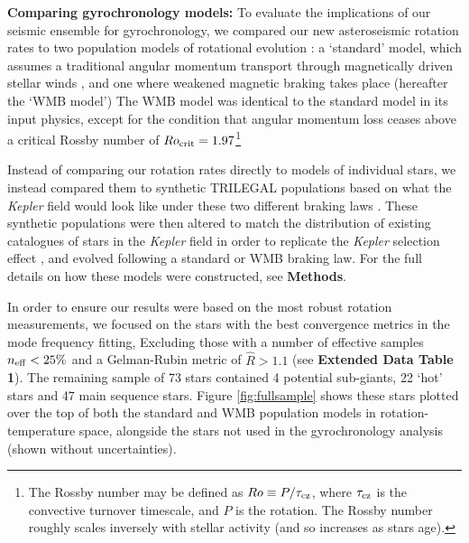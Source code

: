 \documentclass[12pt]{article}
\newcommand{\kepler}{\emph{Kepler}\xspace}
\begin{document}
\textbf{Comparing gyrochronology models:} To evaluate the implications of our seismic ensemble for gyrochronology, we compared our new asteroseismic rotation rates to two population models of rotational evolution \cite{vansaders+2019}: a `standard' model, which assumes a traditional angular momentum transport through magnetically driven stellar winds \cite{skumanich1972, kawaler1988}, and one where weakened magnetic braking takes place (hereafter the `WMB model') \cite{vansaders+2016}  The WMB model was identical to the standard model in its input physics, except for the condition that angular momentum loss ceases above a critical Rossby number of $Ro_{\rm crit} = 1.97$\footnote{The Rossby number may be defined as $Ro \equiv P/\tau_{\rm cz}$, where $\tau_{\rm cz}$ is the convective turnover timescale, and $P$ is the rotation. The Rossby number roughly scales inversely with stellar activity (and so increases as stars age).}

Instead of comparing our rotation rates directly to models of individual stars, we instead compared them to synthetic TRILEGAL populations based on what the \textit{Kepler} field would look like under these two different braking laws \cite{girardi+2012,vansaders+2019}. These synthetic populations were then altered to match the distribution of existing catalogues of stars in the \kepler field in order to replicate the \kepler selection effect \cite{berger+2020}, and evolved following a standard or WMB braking law. For the full details on how these models were constructed, see \textbf{Methods}.

In order to ensure our results were based on the most robust rotation measurements, we focused on the stars with the best convergence metrics in the mode frequency fitting, Excluding those with a number of effective samples $n_{\rm eff} < 25\%$ and a Gelman-Rubin metric of $\hat{R}>1.1$ \cite{gelman+rubin1992,salvatier+2016} (see \textbf{Extended Data Table 1}). The remaining sample of 73 stars contained 4 potential sub-giants, 22 `hot' stars and 47 main sequence stars. Figure \ref{fig:fullsample} shows these stars plotted over the top of both the standard and WMB population models in rotation-temperature space, alongside the stars not used in the gyrochronology analysis (shown without uncertainties).
\end{document}
